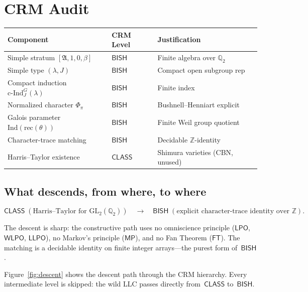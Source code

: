 \documentclass[11pt]{article}
\theoremstyle{plain}
\theoremstyle{definition}
\theoremstyle{remark}
\newcommand{\Z}{\mathbb{Z}}
\newcommand{\Q}{\mathbb{Q}}
\newcommand{\fA}{\mathfrak{A}}
\newcommand{\GL}{\mathrm{GL}}
\newcommand{\Ind}{\mathrm{Ind}}
\newcommand{\cInd}{\mathrm{c\text{-}Ind}}
\newcommand{\rec}{\mathrm{rec}}
\newcommand{\BISH}{\mathsf{BISH}}
\newcommand{\LPO}{\mathsf{LPO}}
\newcommand{\WLPO}{\mathsf{WLPO}}
\newcommand{\LLPO}{\mathsf{LLPO}}
\newcommand{\MP}{\mathsf{MP}}
\newcommand{\FT}{\mathsf{FT}}
\newcommand{\CLASS}{\mathsf{CLASS}}
\newcommand{\Phipi}{\Phi_\pi}
\begin{document}
\section{CRM Audit}\label{sec:crm}

\begin{center}
\begin{tabular}{lll}
\toprule
\textbf{Component} & \textbf{CRM Level} & \textbf{Justification} \\
\midrule
Simple stratum $[\fA, 1, 0, \beta]$ & $\BISH$ & Finite algebra over $\Q_2$ \\
Simple type $(\lambda, J)$ & $\BISH$ & Compact open subgroup rep \\
Compact induction $\cInd_J^G(\lambda)$ & $\BISH$ & Finite index \\
Normalized character $\Phipi$ & $\BISH$ & Bushnell--Henniart explicit \\
Galois parameter $\Ind(\rec(\theta))$ & $\BISH$ & Finite Weil group quotient \\
Character-trace matching & $\BISH$ & Decidable $\Z$-identity \\
Harris--Taylor existence & $\CLASS$ & Shimura varieties (CBN, unused) \\
\bottomrule
\end{tabular}
\end{center}

\subsection{What descends, from where, to where}

\[
  \CLASS \;(\text{Harris--Taylor for } \GL_2(\Q_2))
  \quad\longrightarrow\quad
  \BISH \;(\text{explicit character-trace identity over } \Z).
\]

The descent is sharp: the constructive path uses no
omniscience principle ($\LPO$, $\WLPO$, $\LLPO$), no
Markov's principle ($\MP$), and no Fan Theorem ($\FT$).
The matching is a decidable identity on finite integer
arrays---the purest form of~$\BISH$.

Figure~\ref{fig:descent} shows the descent path through the
CRM hierarchy.  Every intermediate level is skipped: the
wild LLC passes directly from~$\CLASS$ to~$\BISH$.
\end{document}
